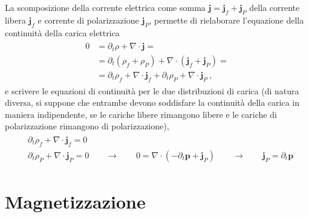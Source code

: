 \documentclass[letterpaper,10pt,italian]{jupyterBook}
\begin{document}
\sphinxAtStartPar
La scomposizione della corrente elettrica come somma \(\mathbf{j} = \mathbf{j}_f + \mathbf{j}_P\) della corrente libera \(\mathbf{j}_f\) e corrente di polarizzazione \(\mathbf{j}_P\), permette di rielaborare l’equazione della continuità della carica elettrica
\begin{equation*}
\begin{split}\begin{aligned}
  0 & = \partial_t \rho + \nabla \cdot \mathbf{j} = \\
    & = \partial_t (\rho_f + \rho_P) + \nabla \cdot \left( \mathbf{j}_f + \mathbf{j}_P \right) = \\
    & = \partial_t \rho_f + \nabla \cdot  \mathbf{j}_f + \partial_t \rho_P + \nabla \cdot \mathbf{j}_P \ ,
\end{aligned}\end{split}
\end{equation*}
\sphinxAtStartPar
e scrivere le equazioni di continuità per le due distribuzioni di carica (di natura diversa, si suppone che entrambe devono soddisfare la continuità della carica in maniera indipendente, se le cariche libere rimangono libere e le cariche di polarizzazione rimangono di polarizzazione),
\begin{equation*}
\begin{split}\begin{aligned}
  & \partial_t \rho_f + \nabla \cdot \mathbf{j}_f = 0 \\
  & \partial_t \rho_P + \nabla \cdot \mathbf{j}_P = 0 \qquad \rightarrow \qquad 0 = \nabla \cdot (-\partial_t \mathbf{p} + \mathbf{j}_P) \qquad \rightarrow \qquad \mathbf{j}_P = \partial_t \mathbf{p}
\end{aligned}\end{split}
\end{equation*}
\sphinxAtStartPar
{} 


\section{Magnetizzazione}
\label{\detokenize{ch/media:magnetizzazione}}
\end{document}
